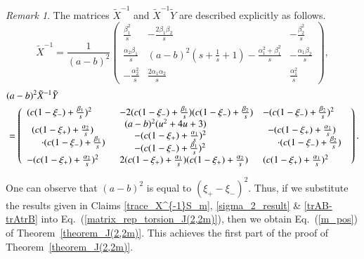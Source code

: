 \documentclass[a4paper]{amsart}
\theoremstyle{plain}
\theoremstyle{definition}
\theoremstyle{remark}
\newtheorem{remark}{Remark}%
\begin{document}
\begin{remark}
 The  matrices $\tilde X^{-1}$ and $\tilde X^{-1} \tilde Y$ are described explicitly as follows.
\[
\tilde X ^{-1}
=
\frac{1}{(a-b)^2}
\left(
\begin{array}{ccc}
\frac{\beta^2_1}{s}  & -\frac{2\beta_1 \beta_2}{s} & -\frac{\beta^2_2}{s} \\
\frac{\alpha_2 \beta_1}{s} & (a-b)^2(s+\frac{1}{s}+1)-\frac{\alpha^2_1+\beta^2_1}{s} & -\frac{\alpha_1 \beta_2}{s} \\
-\frac{\alpha_2^2}{s} & \frac{2\alpha_1 \alpha_2}{s} & \frac{\alpha^2_1}{s}
\end{array}
\right),
\]
\begin{align*}
\lefteqn{
(a-b)^2 \tilde X^{-1} \tilde Y
} & \\
&=
\left(
\begin{array}{lll}
(c(1-\xi_{-})+\frac{\beta_1}{s})^2 & -2(c(1-\xi_{-})+\frac{\beta_1}{s})(c(1-\xi_{-})+\frac{\beta_2}{s}) & -(c(1-\xi_{-})+\frac{\beta_2}{s})^2 \\
\begin{array}{l}
(c(1-\xi_{+})+\frac{\alpha_2}{s})\\
\quad\cdot(c(1-\xi_{-})+\frac{\beta_1}{s})
\end{array}
&
\begin{array}{l}
 (a-b)^2(u^2+4u+3) \\
 \quad - (c(1-\xi_{+})+\frac{\alpha_1}{s})^2 \\
 \quad -(c(1-\xi_{-})+\frac{\beta_1}{s})^2
\end{array}
 &
 \begin{array}{l}
-(c(1-\xi_{+})+\frac{\alpha_1}{s})\\
 \quad \cdot (c(1-\xi_{-})+\frac{\beta_2}{s})
\end{array}
\\
-(c(1-\xi_{+})+\frac{\alpha_2}{s})^2 & 2(c(1-\xi_{+})+\frac{\alpha_1}{s})(c(1-\xi_{+})+\frac{\alpha_2}{s}) &(c(1-\xi_{+})+\frac{\alpha_1}{s})^2 
\end{array}
\right).
\end{align*}
\end{remark}

One can observe that $(a-b)^2$ is equal to $(\xi_{+} - \xi_{-})^2$. Thus, 
if we substitute the results given in
Claims \ref{trace_X^{-1}S_m}, \ref{sigma_2_result} \& \ref{trAB-trAtrB}
into Eq.~(\ref{matrix_rep_torsion_J(2,2m)}), then we obtain Eq.~(\ref{m_pos}) of Theorem~\ref{theorem_J(2,2m)}. This achieves the first part of the proof of Theorem~\ref{theorem_J(2,2m)}. 
\end{document}
